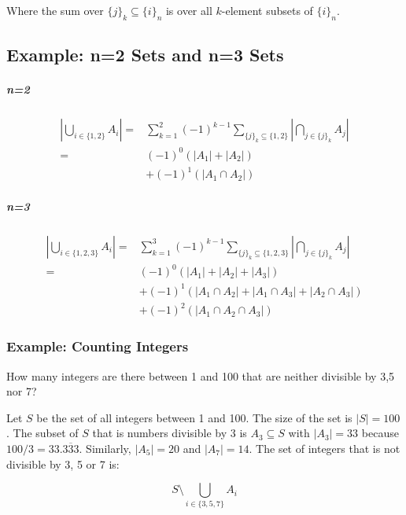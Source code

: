 Where the sum over $\{j\}_k \subseteq \{i\}_n$ is over all $k$-element subsets of $\{i\}_n$.

\subsection{Example: n=2 Sets and n=3 Sets}

\subparagraph{n=2}
\begin{equation}
\begin{array}{rl}
\left|\bigcup_{i\in\{1,2\}}A_i\right| =&  \sum^2_{k=1} (-1)^{k-1} \sum_{\{j\}_k \subseteq \{1,2\}} \left|\bigcap_{j\in\{j\}_k} A_j\right|\\
=&(-1)^{0}\left(|A_1| + |A_2|\right) \\
&+ (-1)^{1}\left(|A_1 \cap A_2| \right)
\end{array}
\end{equation}


\subparagraph{n=3}
\begin{equation}
\begin{array}{rl}
\left|\bigcup_{i\in\{1,2,3\}}A_i\right| =&  \sum^3_{k=1} (-1)^{k-1} \sum_{\{j\}_k \subseteq \{1,2,3\}} \left|\bigcap_{j\in\{j\}_k} A_j\right|\\
=&(-1)^{0}\left(|A_1| + |A_2| + |A_3|\right) \\
&+ (-1)^{1}\left(|A_1 \cap A_2|  + |A_1 \cap A_3| + |A_2 \cap A_3|  \right) \\ 
&+ (-1)^{2}\left(|A_1 \cap A_2 \cap A_3|   \right)
\end{array}
\end{equation}

\subsubsection{Example: Counting Integers}

How many integers are there between 1 and 100 that are neither divisible by 3,5 nor 7?

Let $S$ be the set of all integers between 1 and 100. The size of the set is $|S| = 100$. The subset of $S$ that is numbers divisible by 3 is $A_3 \subseteq S$ with $|A_3| = 33$ because $100/3 = 33.\overline{333}$. Similarly, $|A_5| = 20$ and $|A_7| = 14$.  The set of integers that is not divisible by 3, 5 or 7 is:

\begin{equation}
S \setminus \bigcup_{i\in\{3,5,7\}} A_i
\end{equation}

